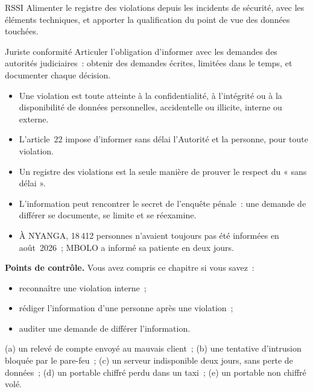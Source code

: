 \begin{boxmetier}{RSSI}
Alimenter le registre des violations depuis les incidents de sécurité, avec
les éléments techniques, et apporter la qualification du point de vue des
données touchées.
\end{boxmetier}

\begin{boxmetier}{Juriste conformité}
Articuler l'obligation d'informer avec les demandes des autorités
judiciaires~: obtenir des demandes écrites, limitées dans le temps, et
documenter chaque décision.
\end{boxmetier}

\begin{boxresume}
\begin{itemize}
    \item Une violation est toute atteinte à la confidentialité, à
          l'intégrité ou à la disponibilité de données personnelles,
          accidentelle ou illicite, interne ou externe.
    \item L'article~22 impose d'informer sans délai l'Autorité et la
          personne, pour toute violation.
    \item Un registre des violations est la seule manière de prouver le
          respect du « sans délai ».
    \item L'information peut rencontrer le secret de l'enquête pénale~: une
          demande de différer se documente, se limite et se réexamine.
    \item À NYANGA, 18\,412 personnes n'avaient toujours pas été informées
          en août~2026~; MBOLO a informé sa patiente en deux jours.
\end{itemize}
\end{boxresume}

\begin{boxinfo}
\textbf{Points de contrôle.} Vous avez compris ce chapitre si vous savez~:
\begin{itemize}
    \item reconnaître une violation interne~;
    \item rédiger l'information d'une personne après une violation~;
    \item auditer une demande de différer l'information.
\end{itemize}
\end{boxinfo}

\begin{boxexo}[title={\ding{45}\quad Exercice~12.1. Violation ou non \niveaubase}]
(a) un relevé de compte envoyé au mauvais client~; (b) une tentative
d'intrusion bloquée par le pare-feu~; (c) un serveur indisponible deux
jours, sans perte de données~; (d) un portable chiffré perdu dans un
taxi~; (e) un portable non chiffré volé.
\end{boxexo}


